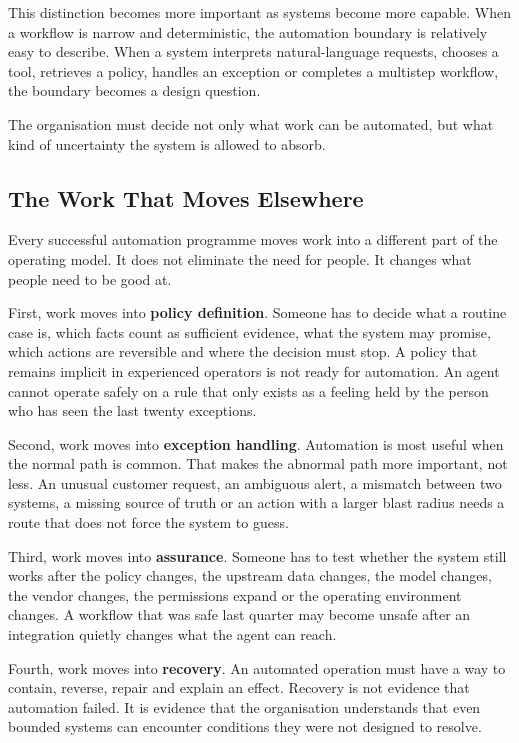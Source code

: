 This distinction becomes more important as systems become more capable.
When a workflow is narrow and deterministic, the automation boundary is
relatively easy to describe. When a system interprets natural-language
requests, chooses a tool, retrieves a policy, handles an exception or
completes a multistep workflow, the boundary becomes a design question.

The organisation must decide not only what work can be automated, but
what kind of uncertainty the system is allowed to absorb.

\subsection{The Work That Moves
Elsewhere}\label{the-work-that-moves-elsewhere}

Every successful automation programme moves work into a different part
of the operating model. It does not eliminate the need for people. It
changes what people need to be good at.

First, work moves into \textbf{policy definition}. Someone has to decide
what a routine case is, which facts count as sufficient evidence, what
the system may promise, which actions are reversible and where the
decision must stop. A policy that remains implicit in experienced
operators is not ready for automation. An agent cannot operate safely on
a rule that only exists as a feeling held by the person who has seen the
last twenty exceptions.

Second, work moves into \textbf{exception handling}. Automation is most
useful when the normal path is common. That makes the abnormal path more
important, not less. An unusual customer request, an ambiguous alert, a
mismatch between two systems, a missing source of truth or an action
with a larger blast radius needs a route that does not force the system
to guess.

Third, work moves into \textbf{assurance}. Someone has to test whether
the system still works after the policy changes, the upstream data
changes, the model changes, the vendor changes, the permissions expand
or the operating environment changes. A workflow that was safe last
quarter may become unsafe after an integration quietly changes what the
agent can reach.

Fourth, work moves into \textbf{recovery}. An automated operation must
have a way to contain, reverse, repair and explain an effect. Recovery
is not evidence that automation failed. It is evidence that the
organisation understands that even bounded systems can encounter
conditions they were not designed to resolve.

